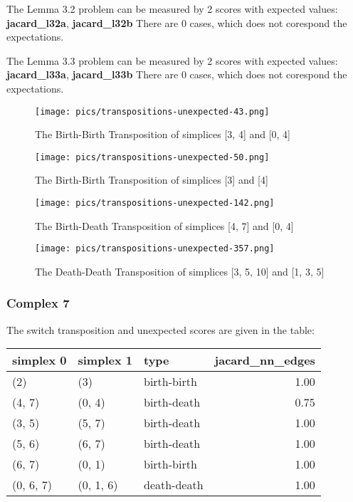 \documentclass{article}
\begin{document}
\par The Lemma 3.2 problem can be measured by 2 scores with expected
values: \textbf{jacard\_l32a}, \textbf{jacard\_l32b}
There are 0 cases, which does not corespond the expectations.

\par The Lemma 3.3 problem can be measured by 2 scores with expected
values: \textbf{jacard\_l33a}, \textbf{jacard\_l33b}
There are 0 cases, which does not corespond the expectations.

\begin{figure}[ht]
\centering
\texttt{[image: pics/transpositions-unexpected-43.png]}
\caption{The Birth-Birth Transposition of simplices [3, 4] and [0, 4]}
\label{fig:unexpected43}
\end{figure}

\begin{figure}[ht]
\centering
\texttt{[image: pics/transpositions-unexpected-50.png]}
\caption{The Birth-Birth Transposition of simplices [3] and [4]}
\label{fig:unexpected50}
\end{figure}

\begin{figure}[ht]
\centering
\texttt{[image: pics/transpositions-unexpected-142.png]}
\caption{The Birth-Death Transposition of simplices [4, 7] and [0, 4]}
\label{fig:unexpected142}
\end{figure}

\begin{figure}[ht]
\centering
\texttt{[image: pics/transpositions-unexpected-357.png]}
\caption{The Death-Death Transposition of simplices [3, 5, 10] and [1, 3, 5]}
\label{fig:unexpected357}
\end{figure}


\subsubsection{Complex 7}
\par The switch transposition and unexpected scores are given in the table:
\begin{center}
\begin{tabular}{lllr}
\toprule
simplex 0 & simplex 1 & type & jacard\_nn\_edges \\
\midrule
(2) & (3) & birth-birth & 1.00 \\
(4, 7) & (0, 4) & birth-death & 0.75 \\
(3, 5) & (5, 7) & birth-death & 1.00 \\
(5, 6) & (6, 7) & birth-death & 1.00 \\
(6, 7) & (0, 1) & birth-birth & 1.00 \\
(0, 6, 7) & (0, 1, 6) & death-death & 1.00 \\
\bottomrule
\end{tabular}
\end{center}
\end{document}
